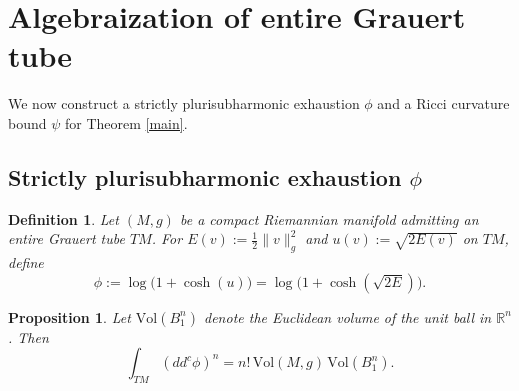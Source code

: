 \documentclass[a4paper, 12pt]{article}
\newcommand{\gC}{g_{\mathbb{C}}}
\newtheorem{prop}[thm]{Proposition}
\newtheorem{defn}[thm]{Definition}
\begin{document}



\section{Algebraization of entire Grauert tube}
We now construct a strictly plurisubharmonic exhaustion $\phi$ and a Ricci curvature bound $\psi$ for Theorem \ref{main}.
\subsection{Strictly plurisubharmonic exhaustion $\phi$}
\begin{defn}
Let $(M,g)$ be a compact Riemannian manifold admitting an entire Grauert tube $TM$. 
For $E(v):=\tfrac{1}{2}\|v\|_g^2$ and $u(v):=\sqrt{2E(v)}$ on $TM$, define
\[
\phi := \log\bigl(1+\cosh(u)\bigr) = \log\bigl(1+\cosh(\sqrt{2E})\bigr).
\]
\end{defn}

\begin{prop}
Let $\mathrm{Vol}(B_1^n)$ denote the Euclidean volume of the unit ball in $\mathbb{R}^n$. Then
\[
\int_{TM} (dd^c\phi)^n = n!\,\mathrm{Vol}(M,g)\,\mathrm{Vol}(B_1^n).
\]
\end{prop}
\end{document}
